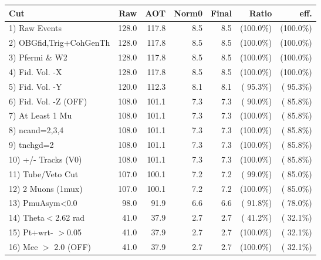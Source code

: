  \begin{table}[h!]\centering
 \begin{tabular}{||l||r|r|r|r|r|r||}
 \hline
 \hline
 Cut & Raw & AOT & Norm0 & Final & Ratio & eff.       \\
 \hline
  1) Raw Events           &        128.0 &        117.8 &          8.5 &          8.5 & (100.0\%) & (100.0\%) \\
  2) OBGfid,Trig+CohGenTh &        128.0 &        117.8 &          8.5 &          8.5 & (100.0\%) & (100.0\%) \\
  3) Pfermi \& W2         &        128.0 &        117.8 &          8.5 &          8.5 & (100.0\%) & (100.0\%) \\
  4) Fid. Vol. -X         &        128.0 &        117.8 &          8.5 &          8.5 & (100.0\%) & (100.0\%) \\
  5) Fid. Vol. -Y         &        120.0 &        112.3 &          8.1 &          8.1 & ( 95.3\%) & ( 95.3\%) \\
  6) Fid. Vol. -Z (OFF)   &        108.0 &        101.1 &          7.3 &          7.3 & ( 90.0\%) & ( 85.8\%) \\
  7) At Least 1 Mu        &        108.0 &        101.1 &          7.3 &          7.3 & (100.0\%) & ( 85.8\%) \\
  8) ncand=2,3,4          &        108.0 &        101.1 &          7.3 &          7.3 & (100.0\%) & ( 85.8\%) \\
  9) tnchgd=2             &        108.0 &        101.1 &          7.3 &          7.3 & (100.0\%) & ( 85.8\%) \\
 10) +/- Tracks (V0)      &        108.0 &        101.1 &          7.3 &          7.3 & (100.0\%) & ( 85.8\%) \\
 11) Tube/Veto Cut        &        107.0 &        100.1 &          7.2 &          7.2 & ( 99.0\%) & ( 85.0\%) \\
 12) 2 Muons (1mux)       &        107.0 &        100.1 &          7.2 &          7.2 & (100.0\%) & ( 85.0\%) \\
 13) PmuAsym<0.0          &         98.0 &         91.9 &          6.6 &          6.6 & ( 91.8\%) & ( 78.0\%) \\
 14) Theta$<$2.62 rad     &         41.0 &         37.9 &          2.7 &          2.7 & ( 41.2\%) & ( 32.1\%) \\
 15) Pt+wrt- $>$0.05      &         41.0 &         37.9 &          2.7 &          2.7 & (100.0\%) & ( 32.1\%) \\
 16) Mee $>$ 2.0  (OFF)   &         41.0 &         37.9 &          2.7 &          2.7 & (100.0\%) & ( 32.1\%) \\

\end{tabular}
\end{table}
